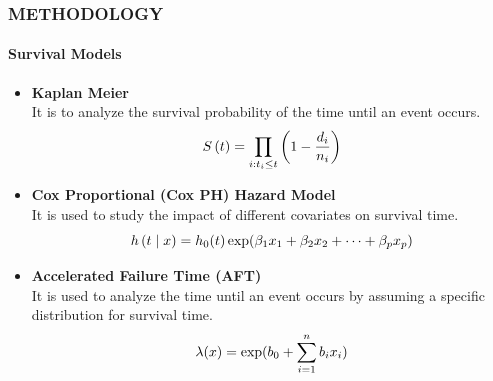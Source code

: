 \documentclass[12pt]{beamer}
\begin{document}
\begin{frame}


		\frametitle{METHODOLOGY}
      \framesubtitle{Survival Models}  

		\begin{itemize}
            \item  \textbf{Kaplan Meier }\\
It is to analyze the survival probability of the time until an event occurs.
\begin{equation} \scriptsize
S\left(t\right)=\prod_{i:t_i\le t}\left(1-\frac{d_i}{n_i}\right)
\end{equation}
    \item \textbf{Cox Proportional (Cox PH) Hazard Model}\\
  It is used to study the impact of different covariates on survival time.
\begin{equation} \scriptsize
h\left(t \mid x\right) = h_0(t) \exp(\beta_1 x_1 + \beta_2 x_2 + \cdots + \beta_p x_p)
\end{equation}

    \item \textbf{Accelerated Failure Time (AFT)}\\
 It is used to analyze the time until an event occurs by assuming a specific distribution for survival time. 
\begin{equation} \scriptsize
\lambda(x) = \exp(b_0 + \sum_{i=1}^{n}{b_i x_i})
\end{equation}


   	\end{itemize}

    \end{frame}
 
\end{document}
